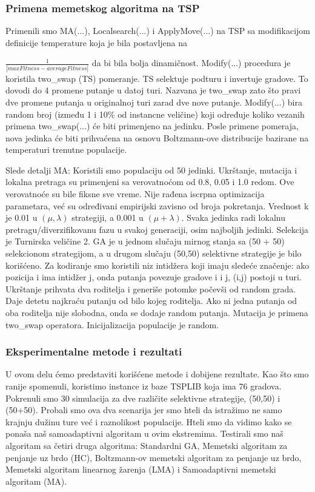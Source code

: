 \documentclass[a4paper]{article}
\begin{document}
\subsubsection{Primena memetskog algoritma na TSP}
\label{subsec:primena}

Primenili smo MA(...), Localsearch(...) i ApplyMove(...) na TSP sa modifikacijom definicije temperature koja je bila postavljena na 

$\frac{1}{|maxFitness - averageFitness|}$ da bi bila bolja dinamičnost. Modify(...) procedura je koristila two\_swap (TS) pomeranje. TS selektuje podturu i invertuje gradove. To dovodi do 4 promene putanje u datoj turi. Nazvana je two\_swap zato što pravi dve promene putanja u originalnoj turi zarad dve nove putanje. Modify(...) bira random broj (između 1 i 10\% od instancne veličine) koji određuje koliko vezanih primena two\_swap(...) će biti primenjeno na jedinku. Posle primene pomeraja, nova jedinka će biti prihvaćena na osnovu Boltzmann-ove distribucije bazirane na temperaturi trenutne populacije. 

Slede detalji MA:
Koristili smo populaciju od 50 jedinki. Ukrštanje, mutacija i lokalna pretraga su  primenjeni sa verovatnoćom od 0.8, 0.05 i 1.0 redom. Ove verovatnoće su bile fiksne sve vreme. Nije rađena iscrpna optimizacija parametara, već su određivani empirijski zavisno od broja pokretanja. Vrednost k je 0.01 u $(\mu,\lambda)$ strategiji, a 0.001 u $(\mu + \lambda)$. Svaka jedinka radi lokalnu pretragu/diverzifikovanu fazu u svakoj generaciji, osim najboljih jedinki. Selekcija je Turnirska veličine 2. GA je u jednom slučaju mirnog stanja sa (50 + 50) selekcionom strategijom, a u drugom slučaju (50,50) selektivne strategije je bilo korišćeno. Za kodiranje smo koristili niz intidžera koji imaju sledeće značenje: ako pozicija i ima intidžer j, onda putanja povezuje gradove i i j, (i,j) postoji u turi. Ukrštanje prihvata dva roditelja i generiše potomke počevši od random grada. Daje detetu najkraću putanju od bilo kojeg roditelja. Ako ni jedna putanja od oba roditelja nije slobodna, onda se dodaje random putanja. Mutacija je primena two\_swap operatora. Inicijalizacija populacije je random. 


\subsubsection{Eksperimentalne metode i rezultati}
\label{sec:rez}

U ovom delu ćemo predstaviti korišćene metode i dobijene rezultate. 
Kao što smo ranije spomenuli, koristimo instance iz baze TSPLIB \cite{TSPLIB} koja ima 76 gradova. Pokrenuli smo 30 simulacija za dve različite selektivne strategije, (50,50) i (50+50). Probali smo ova dva scenarija jer smo hteli da istražimo ne samo krajnju dužinu ture već i raznolikost populacije. Hteli smo da vidimo kako se ponaša naš samoadaptivni algoritam u ovim ekstremima. Testirali smo naš algoritam sa četiri druga algoritma: Standardni GA, Memetski algoritam za penjanje uz brdo (HC), Boltzmann-ov memetski algoritam za penjanje uz brdo, Memetski algoritam linearnog žarenja (LMA) i Samoadaptivni memetski algoritam (MA).
\end{document}
